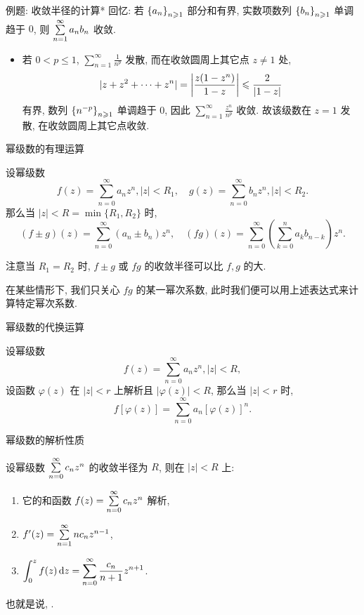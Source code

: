 \begin{frame}{例题: 收敛半径的计算*}
\onslide<+->
回忆: 若 ${\left\{a_n\right\}}_{n\geqslant 1}$ 部分和有界, 实数项数列 ${\left\{b_n\right\}}_{n\geqslant 1}$ 单调趋于 $0$, 则 $\sum\limits_{n=1}^\infty a_nb_n$ 收敛.

\begin{solutione}
\begin{itemize}
\item 若 $0<p\le1$, $\displaystyle\sum_{n=1}^\infty\frac1{n^p}$ 发散, 
\onslide<+->
而在收敛圆周上其它点 $z\neq1$ 处,
\[|z+z^2+\cdots+z^n|=\left|\frac{z(1-z^n)}{1-z}\right|
\leqslant\frac{2}{|1-z|}\]
有界, 数列 ${\left\{n^{-p}\right\}}_{n\geqslant 1}$ 单调趋于 $0$,
\onslide<+->
因此 $\displaystyle\sum_{n=1}^\infty\frac{z^n}{n^p}$ 收敛.
\onslide<+->
故该级数在 $z=1$ 发散, 在收敛圆周上其它点收敛.\qedhere
\end{itemize}
\end{solutione}
\end{frame}


\begin{frame}{幂级数的有理运算}
\begin{theorem}
设幂级数
\[f(z)=\sum_{n=0}^\infty a_nz^n,|z|<R_1,\quad
g(z)=\sum_{n=0}^\infty b_nz^n,|z|<R_2.\]
\onslide<+->
那么当 $|z|<R=\min\{R_1,R_2\}$ 时,
\[(f\pm g)(z)=\sum_{n=0}^\infty (a_n\pm b_n)z^n,\quad
(fg)(z)=\sum_{n=0}^\infty\left(\sum_{k=0}^na_kb_{n-k}\right)z^n.\]
\end{theorem}
\onslide<+->
注意当 $R_1=R_2$ 时, $f\pm g$ 或 $fg$ 的收敛半径可以比 $f,g$ 的大.

\onslide<+->
在某些情形下, 我们只关心 $fg$ 的某一幂次系数,
\onslide<+->
此时我们便可以用上述表达式来计算特定幂次系数.
\end{frame}


\begin{frame}{幂级数的代换运算}
\begin{theorem}
设幂级数
\[f(z)=\sum_{n=0}^\infty a_nz^n,|z|<R,\]
设函数 $\varphi(z)$ 在 $|z|<r$ 上解析且 $|\varphi(z)|<R$, 
\onslide<+->
那么当 $|z|<r$ 时,
\[f[\varphi(z)]=\sum_{n=0}^\infty a_n[\varphi(z)]^n.\]
\end{theorem}
\end{frame}


\begin{frame}{幂级数的解析性质}
\begin{theorem}
设幂级数 $\sum\limits_{n=0}^\infty c_nz^n$ 的收敛半径为 $R$, 则在 $|z|<R$ 上:
\begin{enumerate}
\item 它的和函数 $f(z)=\sum\limits_{n=0}^\infty c_nz^n$ 解析,
\item $f'(z)=\sum\limits_{n=1}^\infty nc_nz^{n-1}$,
\item $\displaystyle\int_0^zf(z)\,\mathrm{d} z=\sum_{n=0}^\infty \frac{c_n}{n+1}z^{n+1}$.
\end{enumerate}
\end{theorem}
\onslide<+->
也就是说, .
\end{frame}



